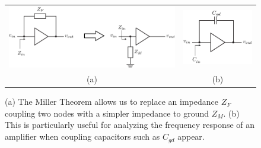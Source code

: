 \begin{figure}[tb]
\begin{center}
\begin{tabular}{cc}
\includegraphics[scale=.9]{miller2} &
\includegraphics[scale=.9]{miller_cap} \\
(a) & (b)  \\
\end{tabular}
\end{center}
\caption{(a) The Miller Theorem allows us to replace an impedance $Z_F$ coupling two nodes with a simpler impedance to ground $Z_M$.  (b) This is particularly useful for analyzing the frequency response of an amplifier when coupling capacitors such as $C_{gd}$ appear.} \label{fig:miller1}
\end{figure}


